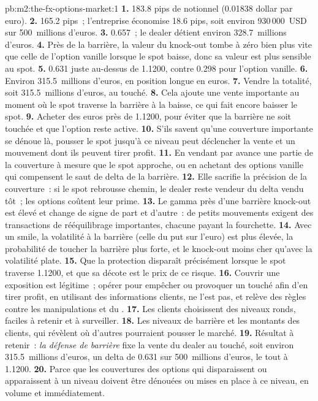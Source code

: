 \begin{solution}{pb:m2:the-fx-options-market:1}
\textbf{1.} 183.8 pips de notionnel (0.01838 dollar par euro).
\textbf{2.} 165.2 pips~; l'entreprise économise 18.6 pips, soit environ 930\,000~USD sur
500~millions d'euros.
\textbf{3.} 0.657~; le dealer détient environ 328.7~millions d'euros.
\textbf{4.} Près de la barrière, la valeur du knock-out tombe à zéro bien plus vite que
celle de l'option vanille lorsque le spot baisse, donc sa valeur est plus sensible au spot.
\textbf{5.} 0.631 juste au-dessus de 1.1200, contre 0.298 pour l'option vanille.
\textbf{6.} Environ 315.5~millions d'euros, en position longue en euros.
\textbf{7.} Vendre la totalité, soit 315.5~millions d'euros, au touché.
\textbf{8.} Cela ajoute une vente importante au moment où le spot traverse la barrière à la baisse,
ce qui fait encore baisser le spot.
\textbf{9.} Acheter des euros près de 1.1200, pour éviter que la barrière ne soit touchée et que l'option
reste active.
\textbf{10.} S'ils savent qu'une couverture importante se dénoue là, pousser le spot jusqu'à ce niveau peut
déclencher la vente et un mouvement dont ils peuvent tirer profit.
\textbf{11.} En vendant par avance une partie de la couverture à mesure que le spot approche, ou en
achetant des options vanille qui compensent le saut de delta de la barrière.
\textbf{12.} Elle sacrifie la précision de la couverture~: si le spot rebrousse chemin, le dealer
reste vendeur du delta vendu tôt~; les options coûtent leur prime.
\textbf{13.} Le gamma près d'une barrière knock-out est élevé et change de signe de part et d'autre~:
de petits mouvements exigent des transactions de rééquilibrage importantes, chacune payant la fourchette.
\textbf{14.} Avec un smile, la volatilité à la barrière (celle du put sur l'euro) est plus élevée,
la probabilité de toucher la barrière plus forte, et le knock-out moins cher qu'avec la
volatilité plate.
\textbf{15.} Que la protection disparaît précisément lorsque le spot traverse 1.1200,
et que sa décote est le prix de ce risque.
\textbf{16.} Couvrir une exposition est légitime~; opérer pour empêcher ou provoquer un
touché afin d'en tirer profit, en utilisant des informations clients, ne l'est pas, et relève
des règles contre les manipulations et du .
\textbf{17.} Les clients choisissent des niveaux ronds, faciles à retenir et à surveiller.
\textbf{18.} Les niveaux de barrière et les montants des clients, qui révèlent où d'autres pourraient pousser
le marché.
\textbf{19.} Résultat à retenir~: \emph{la défense de barrière} fixe la vente du dealer au
touché, soit environ 315.5~millions d'euros, un delta de 0.631 sur 500~millions d'euros, le tout à
1.1200.
\textbf{20.} Parce que les couvertures des options qui disparaissent ou apparaissent à un niveau doivent être
dénouées ou mises en place à ce niveau, en volume et immédiatement.
\end{solution}

